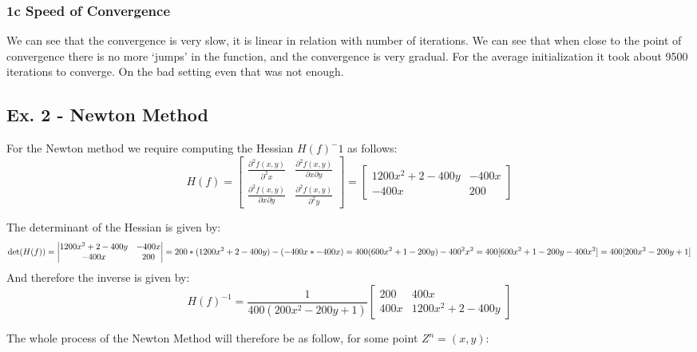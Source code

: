 \documentclass[
]{article}
\begin{document}
\hypertarget{c-speed-of-convergence}{%
\subsubsection{1c Speed of Convergence}\label{c-speed-of-convergence}}

We can see that the convergence is very slow, it is linear in relation
with number of iterations. We can see that when close to the point of
convergence there is no more `jumps' in the function, and the
convergence is very gradual. For the average initialization it took
about 9500 iterations to converge. On the bad setting even that was not
enough.

\hypertarget{ex.-2---newton-method}{%
\subsection{Ex. 2 - Newton Method}\label{ex.-2---newton-method}}

For the Newton method we require computing the Hessian \(H(f)^-1\) as
follows: \[
H(f) =
\begin{bmatrix} \frac{\partial^2 f(x,y)}{\partial^2 x} & \frac{\partial^2 f(x,y)}{\partial x \partial y} \\ \frac{\partial^2 f(x,y)}{\partial x \partial y} & \frac{\partial^2 f(x,y)}{\partial^2 y} \end{bmatrix} =
\begin{bmatrix} 1200x^2 + 2 - 400y & -400x \\ -400x & 200 \end{bmatrix}
\]

The determinant of the Hessian is given by: \[
\det (H(f)) = \begin{vmatrix} 1200x^2 + 2 - 400y & -400x \\ -400x & 200 \end{vmatrix}
=200 *(1200x^2+2-400y) - (-400x * -400x) = 400(600x^2+1-200y) - 400^2x^2= \\
400 [600x^2 + 1 - 200y - 400x^2]= 400[200x^2 - 200y + 1]
\] And therefore the inverse is given by: \[
H(f)^{-1}= \frac{1}{400(200x^2-200y+1)}\begin{bmatrix} 200 & 400x \\ 400x & 1200x^2 + 2 - 400y \end{bmatrix}
\]

The whole process of the Newton Method will therefore be as follow, for
some point \(Z^{n}=(x,y)\):
\end{document}
